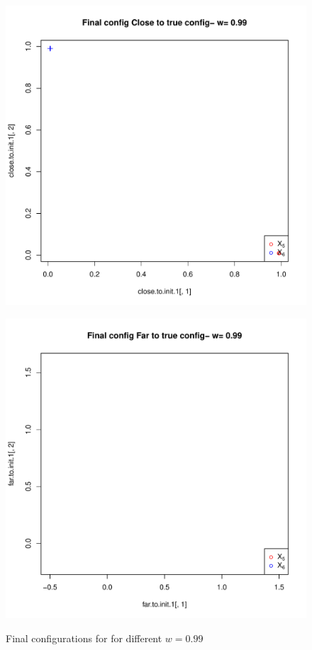 \documentclass[11pt]{article} %
\begin{document}
\begin{figure}
\begin{minipage}[b]{0.5\linewidth}
\centering
\includegraphics[scale=0.35]{true-min-w-0_99.pdf}

\label{fig:figure2-1}
\end{minipage}
\hspace{0.5cm}
\begin{minipage}[b]{0.5\linewidth}
\centering
\includegraphics[scale=0.35]{other-min-w-0_99.pdf}

\label{fig:figure2-2}
\end{minipage}

\caption{Final configurations for for different $w=0.99$ }
\label{fig:Finalconfig-MultMin-w-0_99}

\end{figure}
\end{document}

